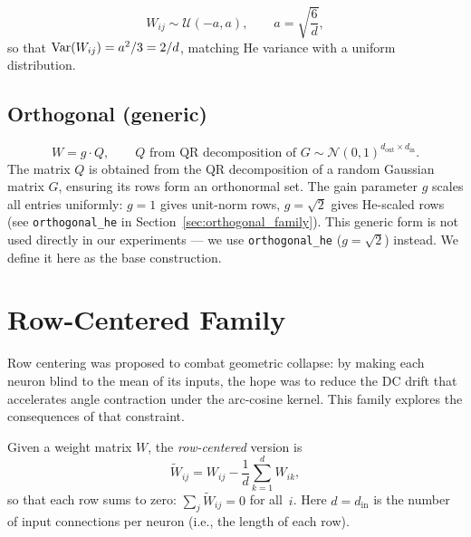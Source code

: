 \begin{equation}
  W_{ij} \sim \mathcal{U}(-a, a), \qquad a = \sqrt{\frac{6}{d}},
\end{equation}
so that $\operatorname{Var}(W_{ij}) = a^2/3 = 2/d$, matching He variance with a
uniform distribution.

\subsection{Orthogonal (generic)}

\begin{equation}
  W = g \cdot Q, \qquad Q \text{ from QR decomposition of }
  G \sim \mathcal{N}(0,1)^{d_{\mathrm{out}} \times d_{\mathrm{in}}}.
\end{equation}
The matrix $Q$ is obtained from the QR decomposition of a random
Gaussian matrix $G$, ensuring its rows form an orthonormal set.
The gain parameter $g$ scales all entries uniformly: $g = 1$ gives
unit-norm rows, $g = \sqrt{2}$ gives He-scaled rows
(see \texttt{orthogonal\_he} in Section~\ref{sec:orthogonal_family}).
This generic form is not used directly in our experiments ---
we use \texttt{orthogonal\_he} ($g = \sqrt{2}$) instead.
We define it here as the base construction.

\section{Row-Centered Family}

\noindent
Row centering was proposed to combat geometric collapse: by making
each neuron blind to the mean of its inputs, the hope was to reduce
the DC drift that accelerates angle contraction under the arc-cosine
kernel.  This family explores the consequences of that constraint.

\begin{definition}
\label{def:row_centering}
Given a weight matrix $W$, the \emph{row-centered} version is
\[
  \tilde{W}_{ij} = W_{ij} - \frac{1}{d}\sum_{k=1}^{d} W_{ik},
\]
so that each row sums to zero: $\sum_j \tilde{W}_{ij} = 0$ for all~$i$.
Here $d = d_{\mathrm{in}}$ is the number of input connections per neuron
(i.e., the length of each row).
\end{definition}

